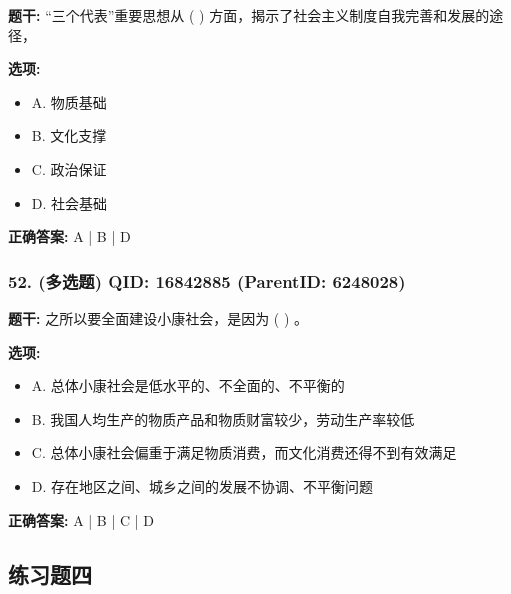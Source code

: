 \documentclass[12pt,UTF8]{ctexart}
\begin{document}
\textbf{题干:}
“三个代表”重要思想从 ( ) 方面，揭示了社会主义制度自我完善和发展的途径，



\textbf{选项:}
\begin{itemize}[leftmargin=*]

  \item A. 物质基础

  \item B. 文化支撑

  \item C. 政治保证

  \item D. 社会基础

\end{itemize}

\textbf{正确答案:}
A | B | D

\vspace{0.3em}\hrulefill\vspace{0.7em}

\subsubsection*{52. (多选题) \small QID: 16842885 (ParentID: 6248028)}

\textbf{题干:}
之所以要全面建设小康社会，是因为 ( ) 。



\textbf{选项:}
\begin{itemize}[leftmargin=*]

  \item A. 总体小康社会是低水平的、不全面的、不平衡的

  \item B. 我国人均生产的物质产品和物质财富较少，劳动生产率较低

  \item C. 总体小康社会偏重于满足物质消费，而文化消费还得不到有效满足

  \item D. 存在地区之间、城乡之间的发展不协调、不平衡问题

\end{itemize}

\textbf{正确答案:}
A | B | C | D

\vspace{0.3em}\hrulefill\vspace{0.7em}

\subsection*{练习题四}
\end{document}
